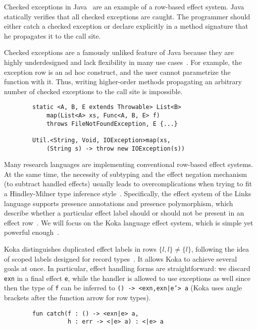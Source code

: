 \documentclass[conference]{IEEEtran}
\begin{document}
    Checked exceptions in Java~\cite{gosling2000java} are an example of a row-based effect system.
    Java statically verifies that all checked exceptions are caught.
    The programmer should either catch a checked exception or declare explicitly in a method signature that he propagates it to the call site.

    Checked exceptions are a famously unliked feature of Java because they are highly underdesigned and lack flexibility in many use cases~\cite{checked-exceptions}.
    For example, the exception row is an ad hoc construct, and the user cannot parametrize the function with it.
    Thus, writing higher-order methods propagating an arbitrary number of checked exceptions to the call site is impossible.

    \begin{verbatim}
        static <A, B, E extends Throwable> List<B>
            map(List<A> xs, Func<A, B, E> f)
            throws FileNotFoundException, E {...}

        Util.<String, Void, IOException>map(xs,
            (String s) -> throw new IOException(s))
    \end{verbatim}


    Many research languages are implementing conventional row-based effect systems.
    At the same time, the necessity of subtyping and the effect negation mechanism (to subtract handled effects) usually leads to overcomplications when trying to fit a Hindley-Milner type inference style~\cite{hindley1969principal, milner1978theory}.
    Specifically, the effect system of the Links language supports presence annotations and presence polymorphism, which describe whether a particular effect label should or should not be present in an effect row~\cite{hillerstrom2016liberating}.
    We will focus on the Koka language effect system, which is simple yet powerful enough~\cite{leijen2014koka, leijen2017type}.

    Koka distinguishes duplicated effect labels in rows $\{l,l\}\neq \{l\}$, following the idea of scoped labels designed for record types~\cite{leijen2005extensible}.
    It allows Koka to achieve several goals at once.
    In particular, effect handling forms are straightforward: we discard \texttt{exn} in a final effect \texttt{e}, while the handler is allowed to use exceptions as well since then the type of \texttt{f} can be inferred to \texttt{() -> <exn,exn|e'> a} (Koka uses angle brackets after the function arrow for row types).
    \begin{verbatim}
        fun catch(f : () -> <exn|e> a,
                  h : err -> <|e> a) : <|e> a
    \end{verbatim}
\end{document}
